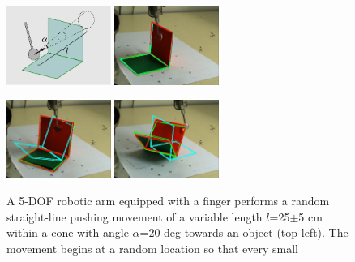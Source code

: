 
\begin{figure}[t]
\centerline{
\includegraphics[width=3.4cm]{training}
\includegraphics[width=3.4cm]{complex1}
}
\centerline{
\includegraphics[width=3.4cm]{complex2}
\includegraphics[width=3.4cm]{complex4}
}
\caption[Setup]{
A 5-DOF robotic arm equipped with a finger
performs a random straight-line pushing movement of a
variable length $l$=25$\pm$5 cm within a cone with
angle $\alpha$=20 deg towards an object (top left).
The movement begins at a random location so that every small
}
\end{figure}
